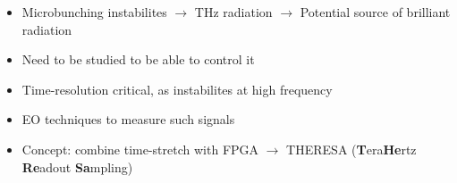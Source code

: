 \begin{itemize}
	\item Microbunching instabilites $\rightarrow$ THz radiation $\rightarrow$ Potential source of brilliant radiation
	\item Need to be studied to be able to control it
	\item Time-resolution critical, as instabilites at high frequency
	\item EO techniques to measure such signals
	\item Concept: combine time-stretch with FPGA $\rightarrow$ THERESA (\textbf{T}era\textbf{He}rtz \textbf{Re}adout \textbf{Sa}mpling)
\end{itemize}


%
%
%
%
%
%

